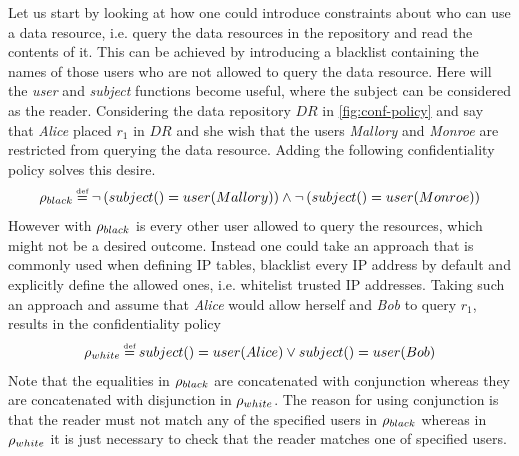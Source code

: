 \begin{example}\label{ex:conf-reader-constraints}
Let us start by looking at how one could introduce constraints about who can use a data resource, i.e. query the data resources in the repository and read the contents of it. This can be achieved by introducing a blacklist containing the names of those users who are not allowed to query the data resource. Here will the \emph{user} and \emph{subject} functions become useful, where the subject can be considered as the reader. Considering the data repository $DR$ in \autoref{fig:conf-policy} and say that \emph{Alice} placed $r_1$ in $DR$ and she wish that the users \emph{Mallory} and \emph{Monroe} are restricted from querying the data resource. Adding the following confidentiality policy solves this desire.
\begin{align*}
    \conf_{black} \eqdef \lnot \left( subject() = user(Mallory) \right) \land \lnot \left( subject() = user(Monroe) \right)
\end{align*}
However with $\rho_{black}$ is every other user allowed to query the resources, which might not be a desired outcome. Instead one could take an approach that is commonly used when defining IP tables, blacklist every IP address by default and explicitly define the allowed ones, i.e. whitelist trusted IP addresses. Taking such an approach and assume that \emph{Alice} would allow herself and \emph{Bob} to query $r_1$, results in the confidentiality policy
\begin{align*}
    \conf_{white} \eqdef subject() = user(Alice) \lor subject() = user(Bob)
\end{align*}
Note that the equalities in $\rho_{black}$ are concatenated with conjunction whereas they are concatenated with disjunction in $\rho_{white}$. The reason for using conjunction is that the reader must not match any of the specified users in $\rho_{black}$ whereas in $\rho_{white}$ it is just necessary to check that the reader matches one of specified users.
\end{example}

